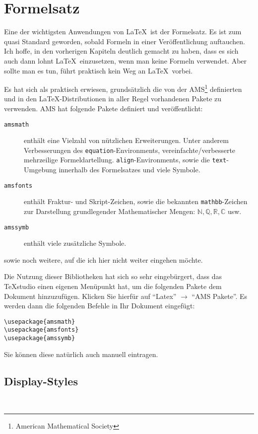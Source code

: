 
\chapter{Formelsatz}\label{chap:formel}

Eine der wichtigsten Anwendungen von \LaTeX\ ist der Formelsatz. Es ist zum quasi Standard geworden, sobald Formeln in einer Veröffentlichung auftauchen. Ich hoffe, in den vorherigen Kapiteln deutlich gemacht zu haben, dass es sich auch dann lohnt \LaTeX\ einzusetzen, wenn man keine Formeln verwendet. Aber sollte man es tun, führt praktisch kein Weg an \LaTeX\ vorbei.

Es hat sich als praktisch erwiesen, grundsätzlich die von der AMS\footnote{American Mathematical Society} definierten und in den \LaTeX-Distributionen in aller Regel vorhandenen Pakete zu verwenden. AMS hat folgende Pakete definiert und veröffentlicht:

\begin{description}
\item[\texttt{amsmath}] enthält eine Vielzahl von nützlichen Erweiterungen. Unter anderem Verbesserungen des \texttt{equation}-Environments, vereinfachte/verbesserte mehrzeilige Formeldartellung. \texttt{align}-Environments, sowie die \texttt{text}-Umgebung innerhalb des Formelsatzes und viele Symbole.
\item[\texttt{amsfonts}] enthält Fraktur- und Skript-Zeichen, sowie die bekannten \texttt{mathbb}-Zeichen zur Darstellung grundlegender Mathematischer Mengen: $\mathbb{N}, \mathbb{Q}, \mathbb{R}, \mathbb{C}$ usw.
\item[\texttt{amssymb}] enthält viele zusätzliche Symbole.

\end{description}
sowie noch weitere, auf die ich hier nicht weiter eingehen möchte.

Die Nutzung dieser Bibliotheken hat sich so sehr eingebürgert, dass das TeXstudio einen eigenen Menüpunkt hat, um die folgenden Pakete dem Dokument hinzuzufügen. Klicken Sie hierfür auf "`Latex"' $\rightarrow$ "`AMS Pakete"'. Es werden dann die folgenden Befehle in Ihr Dokument eingefügt:

\begin{verbatim}
\usepackage{amsmath}
\usepackage{amsfonts}
\usepackage{amssymb}
\end{verbatim}
Sie können diese natürlich auch manuell eintragen.

\section{Display-Styles}\

